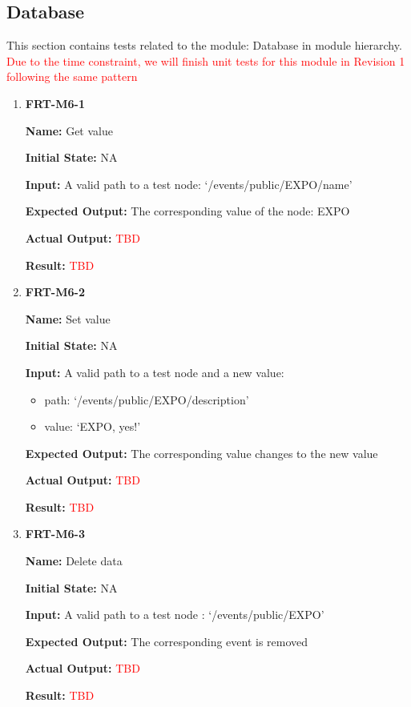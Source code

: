 \documentclass[12pt, titlepage]{article}
\begin{document}
\subsection{Database}
This section contains tests related to the module: Database in module hierarchy. \textcolor{red}{Due to the time constraint, we will finish unit tests for this module in Revision 1 following the same pattern}
\begin{enumerate}
\item \textbf{FRT-M6-1}

\textbf{Name:} Get value

\textbf{Initial State:} NA
					
\textbf{Input:} A valid path to a test node: `/events/public/EXPO/name'
					
\textbf{Expected Output:} The corresponding value of the node: EXPO

\textbf{Actual Output:} \textcolor{red}{TBD}

\textbf{Result:} \textcolor{red}{TBD}

\item \textbf{FRT-M6-2}

\textbf{Name:} Set value

\textbf{Initial State:} NA
					
\textbf{Input:} A valid path to a test node and a new value: 
\begin{itemize}
\item path: `/events/public/EXPO/description'
\item value: `EXPO, yes!'
\end{itemize}

\textbf{Expected Output:} The corresponding value changes to the new value

\textbf{Actual Output:} \textcolor{red}{TBD}

\textbf{Result:} \textcolor{red}{TBD}

\item \textbf{FRT-M6-3}

\textbf{Name:} Delete data

\textbf{Initial State:} NA
					
\textbf{Input:} A valid path to a test node : `/events/public/EXPO'

\textbf{Expected Output:} The corresponding event is removed

\textbf{Actual Output:} \textcolor{red}{TBD}

\textbf{Result:} \textcolor{red}{TBD}
\end{enumerate}
\end{document}
